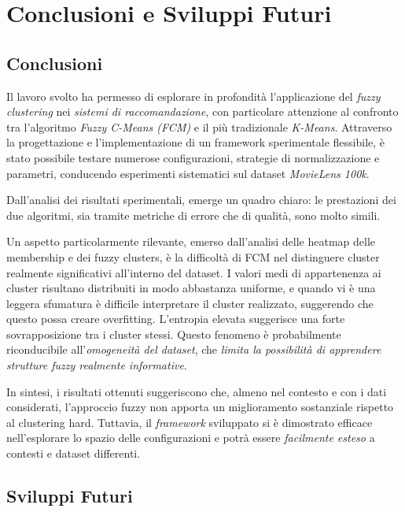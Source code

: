 \chapter{Conclusioni e Sviluppi Futuri}
\label{chap:chap6}

\section{Conclusioni}

Il lavoro svolto ha permesso di esplorare in profondità l'applicazione del \emph{fuzzy clustering} nei \emph{sistemi di raccomandazione}, con particolare attenzione al confronto tra l'algoritmo \emph{Fuzzy C-Means (FCM)} e il più tradizionale \emph{K-Means}. Attraverso la progettazione e l'implementazione di un framework sperimentale flessibile, è stato possibile testare numerose configurazioni, strategie di normalizzazione e parametri, conducendo esperimenti sistematici sul dataset \emph{MovieLens 100k}.

Dall'analisi dei risultati sperimentali, emerge un quadro chiaro: le prestazioni dei due algoritmi, sia tramite metriche di errore che di qualità, sono molto simili.

Un aspetto particolarmente rilevante, emerso dall'analisi delle heatmap delle membership e dei fuzzy clusters, è la difficoltà di FCM nel distinguere cluster realmente significativi all'interno del dataset. I valori medi di appartenenza ai cluster risultano distribuiti in modo abbastanza uniforme, e quando vi è una leggera sfumatura è difficile interpretare il cluster realizzato, suggerendo che questo possa creare overfitting. L'entropia elevata suggerisce una forte sovrapposizione tra i cluster stessi. Questo fenomeno è probabilmente riconducibile all'\emph{omogeneità del dataset}, che \emph{limita la possibilità di apprendere strutture fuzzy realmente informative}.

In sintesi, i risultati ottenuti suggeriscono che, almeno nel contesto e con i dati considerati, l'approccio fuzzy non apporta un miglioramento sostanziale rispetto al clustering hard. Tuttavia, il \emph{framework} sviluppato si è dimostrato efficace nell'esplorare lo spazio delle configurazioni e potrà essere \emph{facilmente esteso} a contesti e dataset differenti.

\section{Sviluppi Futuri}

